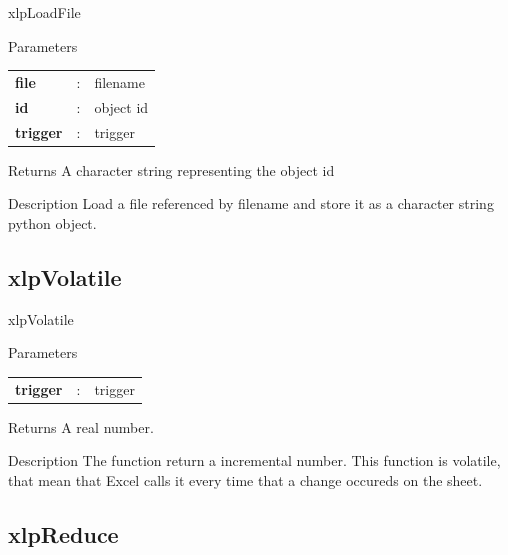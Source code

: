 \begin{xlpfunctitle}{xlpLoadFile}

\begin{xlpfunc}{Parameters}
\begin{tabular}{p{3.5cm}cl}
\textbf{file}& : & filename \\
\textbf{id}& : & object id \\
\textbf{trigger}& : & trigger 
\end{tabular}
\end{xlpfunc}


\begin{xlpfunc}{Returns}
A character string representing the object id
\end{xlpfunc}

\begin{xlpfunc}{Description}
Load a file referenced by filename and store it as a character string python object. 
\end{xlpfunc}
\end{xlpfunctitle}


\subsection{xlpVolatile}

\begin{xlpfunctitle}{xlpVolatile}

\begin{xlpfunc}{Parameters}
\begin{tabular}{p{3.5cm}cl}
\textbf{trigger}& : & trigger 
\end{tabular}
\end{xlpfunc}


\begin{xlpfunc}{Returns}
A real number.
\end{xlpfunc}

\begin{xlpfunc}{Description}
The function return a incremental number. This function is volatile, that mean that Excel calls it every time that a change occureds on the sheet.
\end{xlpfunc}
\end{xlpfunctitle}

\subsection{xlpReduce}

